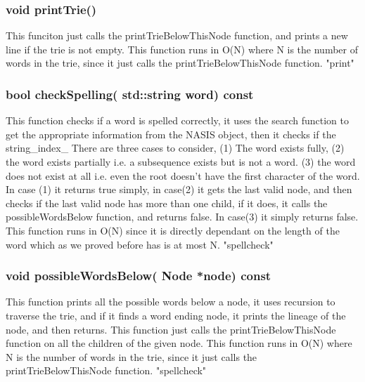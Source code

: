 \subsubsection{{\color{orange}void} {\color{draculapurple}printTrie}()} 
This funciton just calls the {\color{draculapurple}printTrieBelowThisNode} function, and prints a new line if the trie is not empty. This function runs in {\color{lightblue}O(N)} where {\color{lightblue}N} is the number of words in the trie, since it just calls the {\color{draculapurple}printTrieBelowThisNode} function.
{\color{GoldenYellow}"print"}

\subsubsection{{\color{orange}bool} {\color{draculapurple}checkSpelling}({\color{orange} std::string} word) {\color{GoldenYellow} const}}
This function checks if a word is spelled correctly, it uses the {\color{draculapurple}search} function to get the appropriate information from the NASIS object, then it checks if the {\color{draculapurple}string\_index\_}
There are three cases to consider, (1) The word exists fully, (2) the word exists partially i.e. a subsequence exists but is not a word. (3) the word does not exist at all i.e. even the root doesn't have the first character of the word.
In case (1) it returns true simply, in case(2) it gets the last valid node, and then checks if the last valid node has more than one child, if it does, it calls the {\color{draculapurple}possibleWordsBelow} function, and returns false. In case(3) it simply returns false.
This function runs in {\color{lightblue}O(N)} since it is directly dependant on the length of the word which as we proved before has is at most {\color{lightblue}N}.
{\color{GoldenYellow}"spellcheck"}

\subsubsection{{\color{orange}void} {\color{draculapurple}possibleWordsBelow}({\color{orange} Node} *node) {\color{GoldenYellow} const}}
This function prints all the possible words below a node, it uses recursion to traverse the trie, and if it finds a word ending node, it prints the lineage of the node, and then returns. 
This function just calls the {\color{draculapurple}printTrieBelowThisNode} function on all the children of the given node. This function runs in {\color{lightblue}O(N)} where {\color{lightblue}N} is the number of words in the trie, since it just calls the {\color{draculapurple}printTrieBelowThisNode} function.
{\color{GoldenYellow}"spellcheck"}

